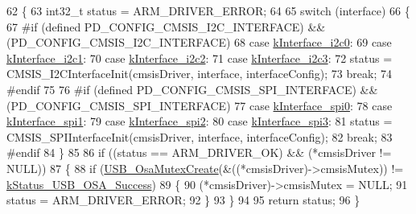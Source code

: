 \begin{DoxyCode}
62 \{
63     int32\_t status = ARM\_DRIVER\_ERROR;
64 
65     \textcolor{keywordflow}{switch} (interface)
66     \{
67 \textcolor{preprocessor}{#if (defined PD\_CONFIG\_CMSIS\_I2C\_INTERFACE) && (PD\_CONFIG\_CMSIS\_I2C\_INTERFACE)
}
68 \textcolor{preprocessor}{}        \textcolor{keywordflow}{case} \hyperlink{group__usb__pd__stack_gga4aed694f998da91dea8d218596d65c1ea0e6fc11f3fbc9732619f2083042e7e17}{kInterface\_i2c0}:
69         \textcolor{keywordflow}{case} \hyperlink{group__usb__pd__stack_gga4aed694f998da91dea8d218596d65c1eaf78fb0f4bdd4db6e8a2e5dab05ba59d2}{kInterface\_i2c1}:
70         \textcolor{keywordflow}{case} \hyperlink{group__usb__pd__stack_gga4aed694f998da91dea8d218596d65c1ea7e08032b6509673dc643a7d01a5baec4}{kInterface\_i2c2}:
71         \textcolor{keywordflow}{case} \hyperlink{group__usb__pd__stack_gga4aed694f998da91dea8d218596d65c1ea369545de00e8d0fb91e9f065d725c16c}{kInterface\_i2c3}:
72             status = CMSIS\_I2CInterfaceInit(cmsisDriver, interface, interfaceConfig);
73             \textcolor{keywordflow}{break};
74 \textcolor{preprocessor}{#endif
}
75 \textcolor{preprocessor}{}
76 \textcolor{preprocessor}{#if (defined PD\_CONFIG\_CMSIS\_SPI\_INTERFACE) && (PD\_CONFIG\_CMSIS\_SPI\_INTERFACE)
}
77 \textcolor{preprocessor}{}        \textcolor{keywordflow}{case} \hyperlink{group__usb__pd__stack_gga4aed694f998da91dea8d218596d65c1ea48b48a50986d3b6fd9e7640cbea852ef}{kInterface\_spi0}:
78         \textcolor{keywordflow}{case} \hyperlink{group__usb__pd__stack_gga4aed694f998da91dea8d218596d65c1ea178b943373d02f27c53232f7e31e62a6}{kInterface\_spi1}:
79         \textcolor{keywordflow}{case} \hyperlink{group__usb__pd__stack_gga4aed694f998da91dea8d218596d65c1ea1a8206ebb4a5aa81b0401b26d239ad9d}{kInterface\_spi2}:
80         \textcolor{keywordflow}{case} \hyperlink{group__usb__pd__stack_gga4aed694f998da91dea8d218596d65c1ea0842cd2e8c57954daf912b6d7b648e9f}{kInterface\_spi3}:
81             status = CMSIS\_SPIInterfaceInit(cmsisDriver, interface, interfaceConfig);
82             \textcolor{keywordflow}{break};
83 \textcolor{preprocessor}{#endif
}
84 \textcolor{preprocessor}{}    \}
85 
86     \textcolor{keywordflow}{if} ((status == ARM\_DRIVER\_OK) && (*cmsisDriver != NULL))
87     \{
88         \textcolor{keywordflow}{if} (\hyperlink{group__usb__os__abstraction_gaf36ecc5a6c3359a6587750b17800f49d}{USB\_OsaMutexCreate}(&((*cmsisDriver)->cmsisMutex)) != 
      \hyperlink{group__usb__os__abstraction_gga453ebd2f93aafb8c938c3a23c815f9bdab90805fb75297fda1ca60dbb2283f933}{kStatus\_USB\_OSA\_Success})
89         \{
90             (*cmsisDriver)->cmsisMutex = NULL;
91             status = ARM\_DRIVER\_ERROR;
92         \}
93     \}
94 
95     \textcolor{keywordflow}{return} status;
96 \}
\end{DoxyCode}


